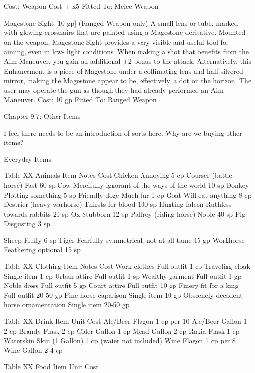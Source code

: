 \documentclass[oneside,11pt,english]{book}
\begin{document}
Cost: Weapon Cost + x5 
Fitted To: Melee Weapon 

 

 

Magestone Sight [10 gp] (Ranged Weapon only) 
A small lens or tube, marked with glowing crosshairs that are painted using a Magestone derivative. 
Mounted on the weapon, Magestone Sight provides a very visible and useful tool for aiming, even in low-
light conditions. When making a shot that benefits from the Aim Maneuver, you gain an additional +2 
bonus to the attack. Alternatively, this Enhancement is a piece of Magestone under a collimating lens and 
half-silvered mirror, making the Magestone appear to be, effectively, a dot on the horizon. The user may 
operate the gun as though they had already performed an Aim Maneuver. 
Cost: 10 gp 
Fitted To: Ranged Weapon 
 
Chapter 9.7: Other Items 

 

 

I feel there needs to be an introduction of sorts here. Why are we buying other items? 

 

Everyday Items 

 
Table XX Animals 
Item Notes Cost 
Chicken Annoying 5 cp 
Courser (battle horse) Fast 60 sp 
Cow Mercifully ignorant of the ways of the world 10 sp 
Donkey Plotting something 5 sp 
Friendly doge Much fur 1 cp 
Goat Will eat anything 8 cp 
Destrier (heavy warhorse) Thirsts for blood 100 sp 
Hunting falcon Ruthless towards rabbits 20 sp 
Ox Stubborn 12 sp 
Palfrey (riding horse) Noble 40 sp 
Pig Disgusting 3 sp 


Sheep Fluffy 6 sp 
Tiger Fearfully symmetrical, not at all tame 15 gp 
Workhorse Feathering optional 15 sp 

 
Table XX Clothing 
Item Notes Cost 
Work clothes Full outfit 1 cp 
Traveling cloak Single item 1 cp 
Urban attire Full outfit 1 sp 
Wealthy garment Full outfit 1 gp 
Noble dress Full outfit 5 gp 
Court attire Full outfit 10 gp 
Finery fit for a king Full outfit 20-50 gp 
Fine horse caparison Single item 10 gp 
Obscenely decadent horse ornamentation Single item 20-50 gp 

 
Table XX Drink 
Item Unit Cost 
Ale/Beer Flagon 1 cp per 10 
Ale/Beer Gallon 1-2 cp 
Brandy Flask 2 cp 
Cider Gallon 1 cp 
Mead Gallon 2 cp 
Rakia Flask 1 cp 
Waterskin Skin (1 Gallon) 1 cp (water not included) 
Wine Flagon 1 cp per 8 
Wine Gallon 2-4 cp 

 
Table XX Food 
Item Unit Cost 
\end{document}
